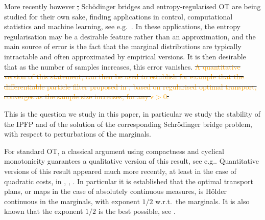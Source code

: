 \documentclass[11pt,a4paper]{article}
\providecommand{\DIFdeltex}[1]{{\protect\color{red}\sout{#1}}}                      %
\providecommand{\DIFdelbegin}{} %
\providecommand{\DIFdelend}{} %
\providecommand{\DIFdel}[1]{\texorpdfstring{\DIFdeltex{#1}}{}} %
\begin{document}
More recently however \DIFdelbegin \DIFdel{, }\DIFdelend Sch\"odinger bridges and entropy-regularised OT are being studied for their own sake, finding applications in control, computational statistics and machine learning, see e.g.\
\cite{bernton2019schr,chen2021optimal,corenflos2021differentiable,de2021diffusion, huang2021schrodinger, vargas2021solving}. In these applications, the entropy regularisation may be a desirable feature rather than an approximation, and the main source of error is the fact that the marginal distributions are typically intractable and often approximated by empirical versions. It is then  desirable that as the number of samples increases, this error vanishes. \DIFdelbegin \DIFdel{\textcolor{orange}{A quantitative version of this statement, can then be used to establish for example that the differentiable particle filter proposed in \cite{corenflos2021differentiable}, based on regularised optimal transport, converges as the sample size increases, for any $\epsilon>0$.}
}%

\DIFdelend This is the question we study in this paper, in particular we study the stability of the IPFP and of the solution of the corresponding Schr\"odinger bridge problem, with respect to perturbations of the marginals. 

For standard OT, a classical argument 
using compactness  and cyclical monotonicity guarantees a qualitative version of this result, see e.g.\cite[Theorem~5.23, Corollary~5.23]{villani2009optimal}. Quantitative versions of this result appeared much more recently, at least in the case of quadratic costs, in \cite{merigot2020quantitative}, \cite{li2020quantitative}, \cite{delalande2021quantitative}. In particular it is established that the optimal transport plans, or maps in the case of absolutely continuous measures, is H\"older continuous in the marginals, with exponent $1/2$ w.r.t.\ the marginals. 
It is also known that the exponent $1/2$ is the best possible, see \cite{gigli2011holder}.
\end{document}
